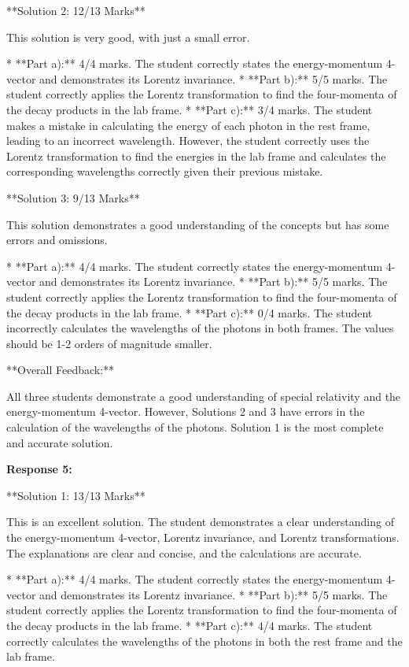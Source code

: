 \documentclass[a4paper,11pt]{article}
\begin{document}
**Solution 2: 12/13 Marks**

This solution is very good, with just a small error.

*   **Part a):** 4/4 marks. The student correctly states the energy-momentum 4-vector and demonstrates its Lorentz invariance.
*   **Part b):** 5/5 marks. The student correctly applies the Lorentz transformation to find the four-momenta of the decay products in the lab frame.
*   **Part c):** 3/4 marks. The student makes a mistake in calculating the energy of each photon in the rest frame, leading to an incorrect wavelength. However, the student correctly uses the Lorentz transformation to find the energies in the lab frame and calculates the corresponding wavelengths correctly given their previous mistake.

**Solution 3: 9/13 Marks**

This solution demonstrates a good understanding of the concepts but has some errors and omissions.

*   **Part a):** 4/4 marks. The student correctly states the energy-momentum 4-vector and demonstrates its Lorentz invariance.
*   **Part b):** 5/5 marks. The student correctly applies the Lorentz transformation to find the four-momenta of the decay products in the lab frame.
*   **Part c):** 0/4 marks. The student incorrectly calculates the wavelengths of the photons in both frames. The values should be 1-2 orders of magnitude smaller.

**Overall Feedback:**

All three students demonstrate a good understanding of special relativity and the energy-momentum 4-vector. However, Solutions 2 and 3 have errors in the calculation of the wavelengths of the photons. Solution 1 is the most complete and accurate solution.

\textbf{Response 5:}

**Solution 1: 13/13 Marks**

This is an excellent solution. The student demonstrates a clear understanding of the energy-momentum 4-vector, Lorentz invariance, and Lorentz transformations. The explanations are clear and concise, and the calculations are accurate.

*   **Part a):** 4/4 marks. The student correctly states the energy-momentum 4-vector and demonstrates its Lorentz invariance.
*   **Part b):** 5/5 marks. The student correctly applies the Lorentz transformation to find the four-momenta of the decay products in the lab frame.
*   **Part c):** 4/4 marks. The student correctly calculates the wavelengths of the photons in both the rest frame and the lab frame.
\end{document}
